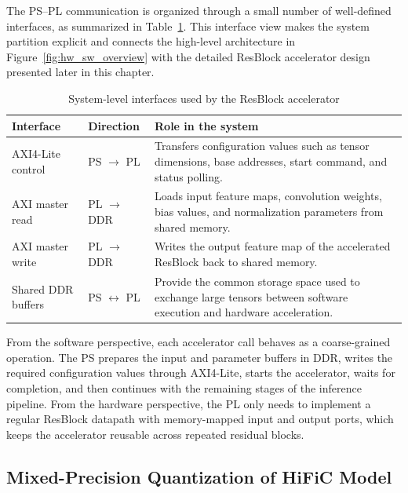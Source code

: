 The PS--PL communication is organized through a small number of well-defined interfaces, as summarized in Table~\ref{tab:system_interfaces}. This interface view makes the system partition explicit and connects the high-level architecture in Figure~\ref{fig:hw_sw_overview} with the detailed ResBlock accelerator design presented later in this chapter.

\begin{table}[H]
\centering
\caption{System-level interfaces used by the ResBlock accelerator}
\label{tab:system_interfaces}
\begin{tabularx}{\textwidth}{|p{}|p{}|X|}
\hline
\textbf{Interface} & \textbf{Direction} & \textbf{Role in the system} \\
\hline
AXI4-Lite control & PS $\rightarrow$ PL & Transfers configuration values such as tensor dimensions, base addresses, start command, and status polling. \\
\hline
AXI master read & PL $\rightarrow$ DDR & Loads input feature maps, convolution weights, bias values, and normalization parameters from shared memory. \\
\hline
AXI master write & PL $\rightarrow$ DDR & Writes the output feature map of the accelerated ResBlock back to shared memory. \\
\hline
Shared DDR buffers & PS $\leftrightarrow$ PL & Provide the common storage space used to exchange large tensors between software execution and hardware acceleration. \\
\hline
\end{tabularx}
\end{table}

From the software perspective, each accelerator call behaves as a coarse-grained operation. The PS prepares the input and parameter buffers in DDR, writes the required configuration values through AXI4-Lite, starts the accelerator, waits for completion, and then continues with the remaining stages of the inference pipeline. From the hardware perspective, the PL only needs to implement a regular ResBlock datapath with memory-mapped input and output ports, which keeps the accelerator reusable across repeated residual blocks.

\subsection{Mixed-Precision Quantization of HiFiC Model}

